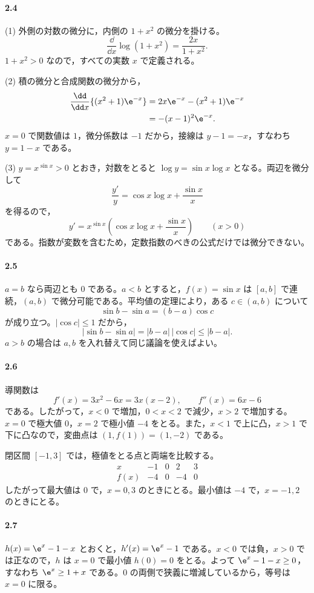 \paragraph{2.4}
(1) 外側の対数の微分に，内側の $1+x^2$ の微分を掛ける。
\[
 \frac{\dd}{\dd x}\log(1+x^2)=\frac{2x}{1+x^2}.
\]
$1+x^2>0$ なので，すべての実数 $x$ で定義される。

(2) 積の微分と合成関数の微分から，
\begin{align*}
 \frac{\dd}{\dd x}\{(x^2+1)\e^{-x}\}
 &=2x\e^{-x}-(x^2+1)\e^{-x}\\
 &=-(x-1)^2\e^{-x}.
\end{align*}
$x=0$ で関数値は $1$，微分係数は $-1$ だから，接線は $y-1=-x$，すなわち $y=1-x$ である。

(3) $y=x^{\sin x}>0$ とおき，対数をとると $\log y=\sin x\log x$ となる。両辺を微分して
\[
 \frac{y'}y=\cos x\log x+\frac{\sin x}{x}
\]
を得るので，
\[
 y'=x^{\sin x}\left(\cos x\log x+\frac{\sin x}{x}\right)
 \qquad(x>0)
\]
である。指数が変数を含むため，定数指数のべきの公式だけでは微分できない。

\paragraph{2.5}
$a=b$ なら両辺とも $0$ である。$a<b$ とすると，$f(x)=\sin x$ は $[a,b]$ で連続，$(a,b)$ で微分可能である。平均値の定理により，ある $c\in(a,b)$ について
\[
 \sin b-\sin a=(b-a)\cos c
\]
が成り立つ。$|\cos c|\le1$ だから，
\[
 |\sin b-\sin a|=|b-a|\,|\cos c|\le|b-a|.
\]
$a>b$ の場合は $a,b$ を入れ替えて同じ議論を使えばよい。

\paragraph{2.6}
導関数は
\[
 f'(x)=3x^2-6x=3x(x-2),\qquad f''(x)=6x-6
\]
である。したがって，$x<0$ で増加，$0<x<2$ で減少，$x>2$ で増加する。$x=0$ で極大値 $0$，$x=2$ で極小値 $-4$ をとる。また，$x<1$ で上に凸，$x>1$ で下に凸なので，変曲点は $(1,f(1))=(1,-2)$ である。

閉区間 $[-1,3]$ では，極値をとる点と両端を比較する。
\[
\begin{array}{c|rrrr}
 x&-1&0&2&3\\ \hline
 f(x)&-4&0&-4&0
\end{array}
\]
したがって最大値は $0$ で，$x=0,3$ のときにとる。最小値は $-4$ で，$x=-1,2$ のときにとる。

\paragraph{2.7}
$h(x)=\e^x-1-x$ とおくと，$h'(x)=\e^x-1$ である。$x<0$ では負，$x>0$ では正なので，$h$ は $x=0$ で最小値 $h(0)=0$ をとる。よって $\e^x-1-x\ge0$，すなわち $\e^x\ge1+x$ である。$0$ の両側で狭義に増減しているから，等号は $x=0$ に限る。

